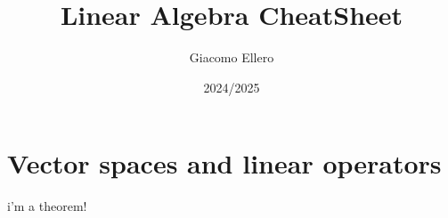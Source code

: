 \documentclass[12pt]{extarticle}
\title{Linear Algebra CheatSheet}
\author{Giacomo Ellero}
\date{2024/2025}
\begin{document}
\firstpage

\section{Vector spaces and linear operators}

\begin{theorem}[my theorem]
    i'm a theorem!
\end{theorem}
\end{document}
